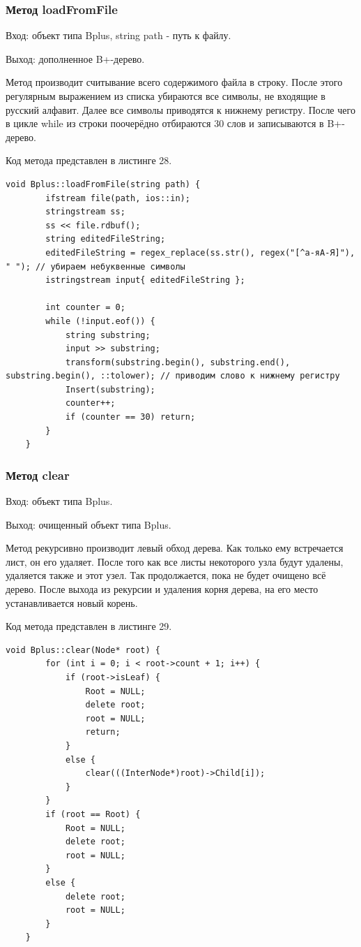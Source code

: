 \documentclass[11pt,a4paper,final]{article} %
\begin{document}
\subsubsection{Метод loadFromFile}
Вход: объект типа Bplus, string path - путь к файлу. \par
Выход: дополненное B+-дерево. \par
Метод производит считывание всего содержимого файла в строку. После этого регулярным выражением из списка убираются все символы, не входящие в русский алфавит. Далее все символы приводятся к нижнему регистру. После чего в цикле while из строки поочерёдно отбираются 30 слов и записываются в B+-дерево.\par
Код метода представлен в листинге 28.
\begin{lstlisting}[label=loadFromFile, caption = Метод loadFromFile]
	void Bplus::loadFromFile(string path) {
		ifstream file(path, ios::in);
		stringstream ss;
		ss << file.rdbuf();
		string editedFileString;
		editedFileString = regex_replace(ss.str(), regex("[^а-яА-Я]"), " "); // убираем небуквенные символы
		istringstream input{ editedFileString };
		
		int counter = 0;
		while (!input.eof()) {
			string substring;
			input >> substring;
			transform(substring.begin(), substring.end(), substring.begin(), ::tolower); // приводим слово к нижнему регистру
			Insert(substring);
			counter++;
			if (counter == 30) return;
		}
	}
\end{lstlisting}


\subsubsection{Метод clear}
Вход: объект типа Bplus. \par
Выход: очищенный объект типа Bplus. \par
Метод рекурсивно производит левый обход дерева. Как только ему встречается лист, он его удаляет. После того как все листы некоторого узла будут удалены, удаляется также и этот узел. Так продолжается, пока не будет очищено всё дерево. После выхода из рекурсии и удаления корня дерева, на его место устанавливается новый корень. \par
Код метода представлен в листинге 29.
\begin{lstlisting}[label=clear, caption = Метод clear]
	void Bplus::clear(Node* root) {
		for (int i = 0; i < root->count + 1; i++) {
			if (root->isLeaf) {
				Root = NULL;
				delete root;
				root = NULL;
				return;
			}
			else {
				clear(((InterNode*)root)->Child[i]);
			}
		}
		if (root == Root) {
			Root = NULL;
			delete root;
			root = NULL;
		}
		else {
			delete root;
			root = NULL;
		}
	}
\end{lstlisting}
\end{document}
